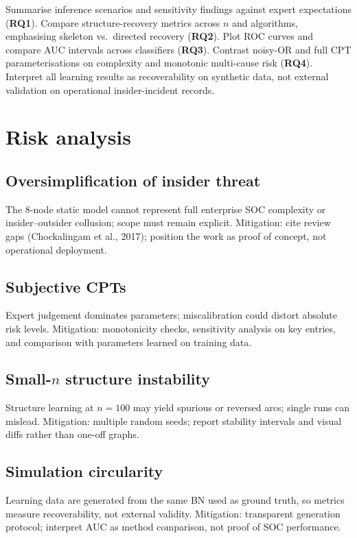 \documentclass[11pt,a4paper]{article}
\begin{document}
Summarise inference scenarios and sensitivity findings against expert expectations (\textbf{RQ1}). Compare structure-recovery metrics across $n$ and algorithms, emphasising skeleton vs.\ directed recovery (\textbf{RQ2}). Plot ROC curves and compare AUC intervals across classifiers (\textbf{RQ3}). Contrast noisy-OR and full CPT parameterisations on complexity and monotonic multi-cause risk (\textbf{RQ4}). Interpret all learning results as recoverability on synthetic data, not external validation on operational insider-incident records.

\section{Risk analysis}

\subsection*{Oversimplification of insider threat}

The 8-node static model cannot represent full enterprise SOC complexity or insider--outsider collusion; scope must remain explicit. Mitigation: cite review gaps (Chockalingam et al., 2017); position the work as proof of concept, not operational deployment.

\subsection*{Subjective CPTs}

Expert judgement dominates parameters; miscalibration could distort absolute risk levels. Mitigation: monotonicity checks, sensitivity analysis on key entries, and comparison with parameters learned on training data.

\subsection*{Small-$n$ structure instability}

Structure learning at $n=100$ may yield spurious or reversed arcs; single runs can mislead. Mitigation: multiple random seeds; report stability intervals and visual diffs rather than one-off graphs.

\subsection*{Simulation circularity}

Learning data are generated from the same BN used as ground truth, so metrics measure recoverability, not external validity. Mitigation: transparent generation protocol; interpret AUC as method comparison, not proof of SOC performance.
\end{document}
